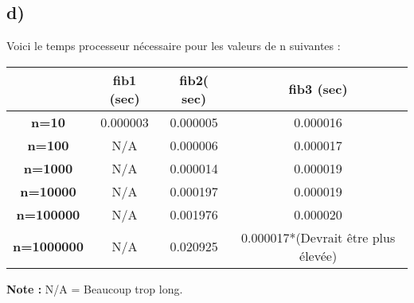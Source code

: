 \documentclass[12pt]{article}
\begin{document}
    \subsection*{d)}
      \noindent Voici le temps processeur nécessaire pour les valeurs de n suivantes :
      \begin{table}[h]
      	\centering
        \begin{tabular}{|c|c|c|c|}
          \hline
          & \textbf{fib1 (sec)} & \textbf{fib2( sec)} & \textbf{fib3 (sec)} \\ \hline
          \textbf{n=10}      & 0.000003            & 0.000005            & 0.000016            \\ \hline
          \textbf{n=100}     & N/A                 & 0.000006            & 0.000017            \\ \hline
          \textbf{n=1000}    & N/A                 & 0.000014            & 0.000019            \\ \hline
          \textbf{n=10000}   & N/A                 & 0.000197            & 0.000019            \\ \hline
          \textbf{n=100000}  & N/A                 & 0.001976            & 0.000020            \\ \hline
          \textbf{n=1000000} & N/A                 & 0.020925            & 0.000017*(Devrait être plus élevée)            \\ \hline
        \end{tabular}
      \end{table}
      \newline
      \textbf{Note :} N/A = Beaucoup trop long.
\end{document}
